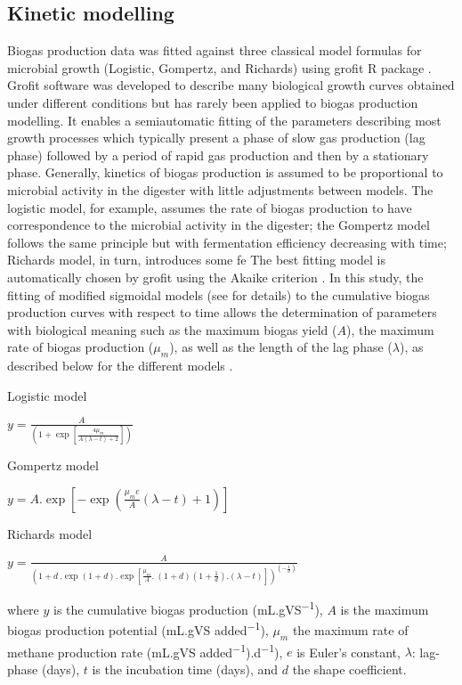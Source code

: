 \subsection{Kinetic modelling}
Biogas production data was fitted against three classical model formulas for microbial growth (Logistic, Gompertz, and Richards) using grofit R package \cite{Kahm_2010}. Grofit software was developed to describe many biological growth curves obtained under different conditions but has rarely been applied to biogas production modelling. It enables a semiautomatic fitting of the parameters describing most growth processes which typically present a phase of slow gas production (lag phase) followed by a period of rapid gas production and then by a stationary phase. Generally, kinetics of biogas production is assumed to be proportional to microbial activity in the digester with little adjustments between models. The logistic model, for example, assumes the rate of biogas production to have correspondence to the microbial activity in the digester; the Gompertz model follows the same principle but with fermentation efficiency decreasing with time; Richards model, in turn, introduces some fe The best fitting model is automatically chosen by grofit using the Akaike criterion \cite{Hasenbrink_2006}. In this study, the fitting of modified sigmoidal models (see \cite{Zwietering1990} for details) to the cumulative biogas production curves with respect to time allows the determination of parameters with biological meaning such as the maximum biogas yield ($A$), the maximum rate of biogas production ($μ_m$), as well as the length of the lag phase ($λ$), as described below for the different models \cite{Zwietering1990,Ware_2017,Alta__2009}.

Logistic model

\(y=\frac{A}{\left(1+\exp\left[\frac{4\mu_m}{A\left(\lambda-t\right)+2}\right]\right)}\)

Gompertz model

\(y=A.\exp\left[-\exp\left(\frac{\mu_me}{A}\left(\lambda-t\right)+1\right)\right]\)

Richards model

\(y=\frac{A}{\left(1+d\ .\exp\left(1+d\right).\exp\left[\frac{\mu_m}{A}.\ \left(1+d\right)\left(1+\frac{1}{d}\right).\left(\lambda-t\right)\right]\right)^{\left(-\frac{1}{d}\right)}}\)


where $y$ is the cumulative biogas production (mL.gVS\textsuperscript{−1}), $A$ is the maximum biogas production potential (mL.gVS added\textsuperscript{−1}), $μ_m$ the maximum rate of methane production rate (mL.gVS added\textsuperscript{−1}).d\textsuperscript{−1}), $e$ is Euler's constant, $λ$: lag-phase (days), $t$ is the incubation time (days), and $d$ the shape coefficient.